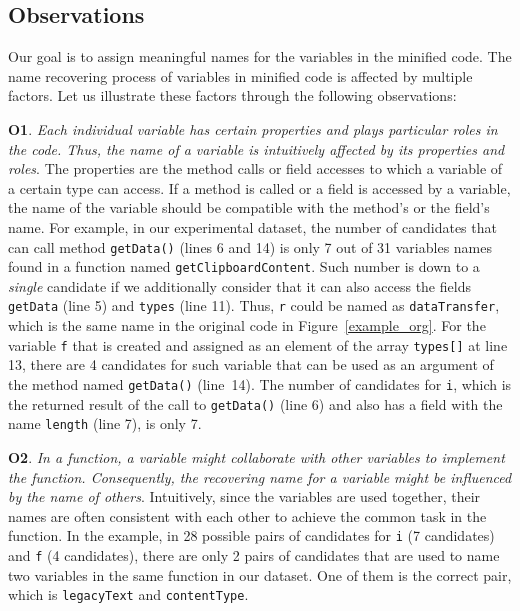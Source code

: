 \subsection{Observations}

Our goal is to assign meaningful names for the variables in the
minified code. The name recovering process of variables in minified
code is affected by multiple factors. Let us illustrate these factors
through the following observations:

\textbf{O1}. \textit{Each individual variable has certain properties
  and plays particular roles in the code. Thus, the name of a variable
  is intuitively affected by its properties and roles}. The properties
are the method calls or field accesses to which a variable of a certain
type can access.
%
If a method is called or a field is accessed
by a variable, the name of the variable should be compatible with the
method's or the field's name.
%
%
%
For example, in our experimental dataset,
the number of candidates that can call method \texttt{getData()}
(lines 6 and 14) is only 7 out of 31 variables names found in a
function named \texttt{getClipboardContent}.
%
%
Such number is down to a \textit{single} candidate if we additionally
consider that it can also access the fields \texttt{getData} (line 5)
and \texttt{types} (line 11). Thus, \texttt{r} could be named
as \texttt{dataTransfer}, which is the same name in the
original code in Figure~\ref{example_org}. For the variable \texttt{f}
that is created and assigned as an element of the array
\texttt{types[]} at line 13, there are 4 candidates for such
variable that can be used as an argument of the method named
\texttt{getData()} (line~14). The number of candidates for \texttt{i},
which is the returned result of the call to \texttt{getData()} (line
6) and also has a field with the name \texttt{length} (line 7), is
only 7.

%
\textbf{O2}. \textit{In a function, a variable might collaborate with
  other variables to implement the function. Consequently, the
  recovering name for a variable might be influenced by the name of
  others}. Intuitively, since the variables are used together, their
names are often consistent with each other to achieve the
common task in the function.
%
In the example, in 28 possible pairs of candidates for \texttt{i} (7
candidates) and \texttt{f} (4 candidates), there are only 2 pairs of
candidates that are used to name two variables in the same function
in our dataset. One of them is the correct pair, which is
\texttt{legacyText} and \texttt{contentType}.
%

